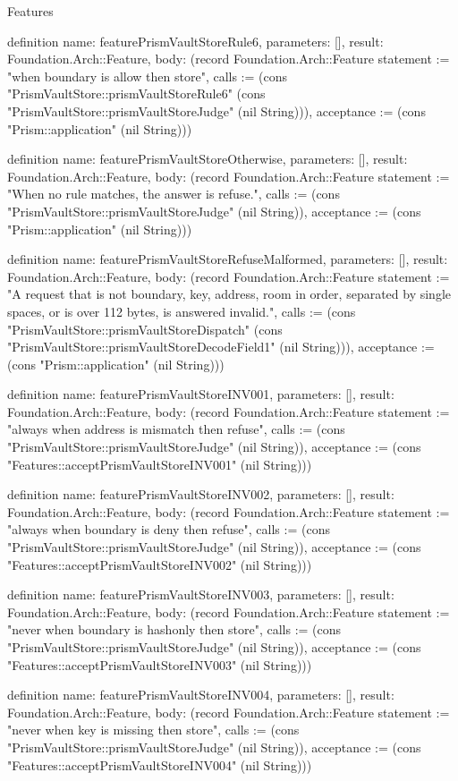 \begin{lexlean}{Features}
\begin{semanticmodule}
definition{
  name: featurePrismVaultStoreRule6,
  parameters: [],
  result: Foundation.Arch::Feature,
  body: (record Foundation.Arch::Feature {statement := "when boundary is allow then store", calls := (cons "PrismVaultStore::prismVaultStoreRule6" (cons "PrismVaultStore::prismVaultStoreJudge" (nil String))), acceptance := (cons "Prism::application" (nil String))})
}

definition{
  name: featurePrismVaultStoreOtherwise,
  parameters: [],
  result: Foundation.Arch::Feature,
  body: (record Foundation.Arch::Feature {statement := "When no rule matches, the answer is refuse.", calls := (cons "PrismVaultStore::prismVaultStoreJudge" (nil String)), acceptance := (cons "Prism::application" (nil String))})
}

definition{
  name: featurePrismVaultStoreRefuseMalformed,
  parameters: [],
  result: Foundation.Arch::Feature,
  body: (record Foundation.Arch::Feature {statement := "A request that is not boundary, key, address, room in order, separated by single spaces, or is over 112 bytes, is answered invalid.", calls := (cons "PrismVaultStore::prismVaultStoreDispatch" (cons "PrismVaultStore::prismVaultStoreDecodeField1" (nil String))), acceptance := (cons "Prism::application" (nil String))})
}

definition{
  name: featurePrismVaultStoreINV001,
  parameters: [],
  result: Foundation.Arch::Feature,
  body: (record Foundation.Arch::Feature {statement := "always when address is mismatch then refuse", calls := (cons "PrismVaultStore::prismVaultStoreJudge" (nil String)), acceptance := (cons "Features::acceptPrismVaultStoreINV001" (nil String))})
}

definition{
  name: featurePrismVaultStoreINV002,
  parameters: [],
  result: Foundation.Arch::Feature,
  body: (record Foundation.Arch::Feature {statement := "always when boundary is deny then refuse", calls := (cons "PrismVaultStore::prismVaultStoreJudge" (nil String)), acceptance := (cons "Features::acceptPrismVaultStoreINV002" (nil String))})
}

definition{
  name: featurePrismVaultStoreINV003,
  parameters: [],
  result: Foundation.Arch::Feature,
  body: (record Foundation.Arch::Feature {statement := "never when boundary is hashonly then store", calls := (cons "PrismVaultStore::prismVaultStoreJudge" (nil String)), acceptance := (cons "Features::acceptPrismVaultStoreINV003" (nil String))})
}

definition{
  name: featurePrismVaultStoreINV004,
  parameters: [],
  result: Foundation.Arch::Feature,
  body: (record Foundation.Arch::Feature {statement := "never when key is missing then store", calls := (cons "PrismVaultStore::prismVaultStoreJudge" (nil String)), acceptance := (cons "Features::acceptPrismVaultStoreINV004" (nil String))})
}


\end{semanticmodule}
\end{lexlean}

